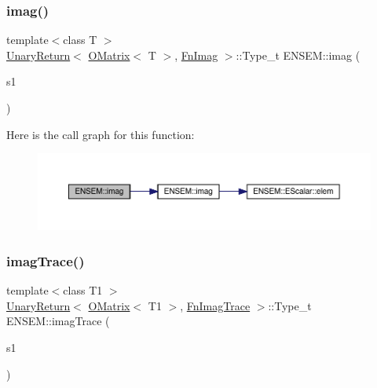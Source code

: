 \subsubsection{\texorpdfstring{imag()}{imag()}}
{\footnotesize\ttfamily template$<$class T $>$ \\
\mbox{\hyperlink{structENSEM_1_1UnaryReturn}{Unary\+Return}}$<$ \mbox{\hyperlink{classENSEM_1_1OMatrix}{O\+Matrix}}$<$ T $>$, \mbox{\hyperlink{structENSEM_1_1FnImag}{Fn\+Imag}} $>$\+::Type\+\_\+t E\+N\+S\+E\+M\+::imag (\begin{DoxyParamCaption}\item[{const \mbox{\hyperlink{classENSEM_1_1OMatrix}{O\+Matrix}}$<$ T $>$ \&}]{s1 }\end{DoxyParamCaption})\hspace{0.3cm}{\ttfamily [inline]}}

Here is the call graph for this function\+:\nopagebreak
\begin{figure}[H]
\begin{center}
\leavevmode
\includegraphics[width=350pt]{d8/d55/group__obsmatrix_ga227c6429f15ec19a09a182551be38dad_cgraph}
\end{center}
\end{figure}
\mbox{\label{group__obsmatrix_ga3c2758e95f41075ca3a027c6651a66aa}} 
\subsubsection{\texorpdfstring{imagTrace()}{imagTrace()}}
{\footnotesize\ttfamily template$<$class T1 $>$ \\
\mbox{\hyperlink{structENSEM_1_1UnaryReturn}{Unary\+Return}}$<$ \mbox{\hyperlink{classENSEM_1_1OMatrix}{O\+Matrix}}$<$ T1 $>$, \mbox{\hyperlink{structENSEM_1_1FnImagTrace}{Fn\+Imag\+Trace}} $>$\+::Type\+\_\+t E\+N\+S\+E\+M\+::imag\+Trace (\begin{DoxyParamCaption}\item[{const \mbox{\hyperlink{classENSEM_1_1OMatrix}{O\+Matrix}}$<$ T1 $>$ \&}]{s1 }\end{DoxyParamCaption})\hspace{0.3cm}{\ttfamily [inline]}}

